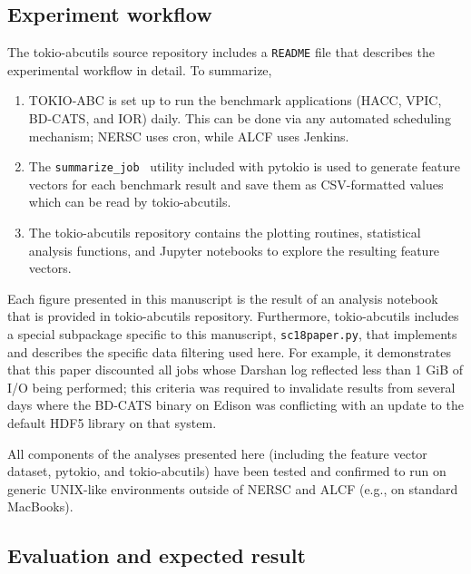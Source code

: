 \subsection{Experiment workflow}

The tokio-abcutils source repository includes a \texttt{README} file that describes the experimental workflow in detail.
To summarize,

\begin{enumerate}[leftmargin=*]

\item TOKIO-ABC is set up to run the benchmark applications (HACC, VPIC, BD-CATS, and IOR) daily.
This can be done via any automated scheduling mechanism; NERSC uses cron, while ALCF uses Jenkins.

\item The \texttt{summarize\_job}~\cite{Lockwood2018tokio} utility included with pytokio is used to generate feature vectors for each benchmark result and save them as CSV-formatted values which can be read by tokio-abcutils.

\item The tokio-abcutils repository contains the plotting routines, statistical analysis functions, and Jupyter notebooks to explore the resulting feature vectors.

\end{enumerate}

Each figure presented in this manuscript is the result of an analysis notebook that is provided in tokio-abcutils repository.
Furthermore, tokio-abcutils includes a special subpackage specific to this manuscript, \texttt{sc18paper.py}, that implements and describes the specific data filtering used here.
For example, it demonstrates that this paper discounted all jobs whose Darshan log reflected less than 1 GiB of I/O being performed; this criteria was required to invalidate results from several days where the BD-CATS binary on Edison was conflicting with an update to the default HDF5 library on that system.

All components of the analyses presented here (including the feature vector dataset, pytokio, and tokio-abcutils) have been tested and confirmed to run on generic UNIX-like environments outside of NERSC and ALCF (e.g., on standard MacBooks).

\subsection{Evaluation and expected result}

